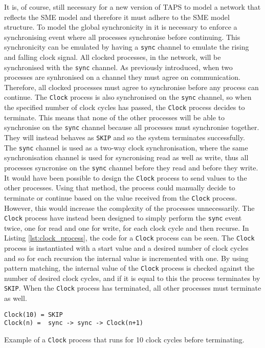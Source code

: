It is, of course, still necessary for a new version of TAPS to model a \cspm{} network that reflects the SME model and therefore it must adhere to the SME model structure. To model the global synchronicity in \cspm{} it is necessary to enforce a synchronising event where all processes synchronise before continuing. This synchronicity can be emulated by having a \texttt{sync} channel to emulate the rising and falling clock signal. All clocked processes, in the network, will be synchronised with the \texttt{sync} channel. As previously introduced, when two processes are synhronised on a channel they must agree on communication. Therefore, all clocked processes must agree to synchronise before any process can continue.
The \texttt{Clock} process is also synchronised on the \texttt{sync} channel, so when the specified number of clock cycles has passed, the \texttt{Clock} process decides to terminate.
This means that none of the other processes will be able to synchronise on the \texttt{sync} channel because all processes must synchronise together. They will instead behaves as \texttt{SKIP} and so the system terminates successfully.\\

The \texttt{sync} channel is used as a two-way clock synchronisation, where the same synchronisation channel is used for syncronising read as well as write, thus all processes syncronise on the \texttt{sync} channel before they read and before they write. It would have been possible to design the \texttt{Clock} process to send values to the other processes. Using that method, the process could manually decide to terminate or continue based on the value received from the \texttt{Clock} process. However, this would increase the complexity of the processes unnecessarily. The \texttt{Clock} process have instead been designed to simply perform the \texttt{sync} event twice, one for read and one for write, for each clock cycle and then recurse. In Listing \ref{lst:clock_process}, the \cspm{} code for a \texttt{Clock} process can be seen. The \texttt{Clock} process is instantiated with a start value and a desired number of clock cycles and so for each recursion the internal value is incremented with one. By using pattern matching, the internal value of the \texttt{Clock} process is checked against the number of desired clock cycles, and if it is equal to this the process terminates by \texttt{SKIP}. When the \texttt{Clock} process has terminated, all other processes must terminate as well.
\begin{listing}
\begin{verbatim}
Clock(10) = SKIP
Clock(n) =  sync -> sync -> Clock(n+1)
\end{verbatim}
\caption{Example of a \texttt{Clock} process that runs for 10 clock cycles before terminating. }
\label{lst:clock_process}
\end{listing}
